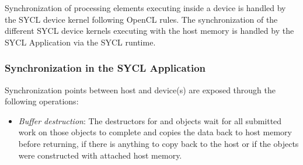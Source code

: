 Synchronization of processing elements executing inside a device is handled
by the SYCL device kernel following OpenCL rules.
The synchronization of the different SYCL device kernels executing with 
the host memory is handled by the SYCL Application via the SYCL runtime.

\subsubsection{Synchronization in the SYCL Application}

Synchronization points between host and device(s) are exposed through 
the following operations:

\begin{itemize}
  \item
    \emph{Buffer destruction}: The destructors for
     and 
    objects wait for all submitted work on those objects to complete
    and copies the data back to host memory before returning, if there
    is anything to copy back to the host or if the objects were
    constructed with attached host memory.


\end{itemize}
